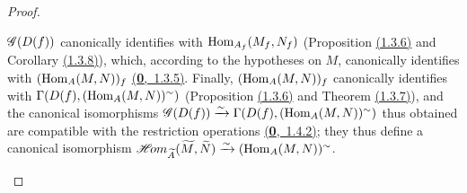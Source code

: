 \begin{proof}
\begin{itemize}
        $\mathscr{G}(D(f))$ canonically identifies with ${\mathop{\mathrm{Hom}}\nolimits}_{A_f}(M_f,N_f)$ (Proposition \hyperref[prop-1.1.3.6]{(1.3.6)}
        and Corollary \hyperref[cor-1.1.3.8]{(1.3.8)}), which, according to the hypotheses on $M$, canonically
        identifies with $({\mathop{\mathrm{Hom}}\nolimits}_A(M,N))_f$ \hyperref[env-0.1.3.5]{(\textbf{0},~1.3.5)}. Finally, $({\mathop{\mathrm{Hom}}\nolimits}_A(M,N))_f$
        canonically identifies with $\Gamma(D(f),({\mathop{\mathrm{Hom}}\nolimits}_A(M,N))^\sim)$ (Proposition \hyperref[prop-1.1.3.6]{(1.3.6)} and
        Theorem \hyperref[thm-1.1.3.7]{(1.3.7)}), and the canonical isomorphisms
        $\mathscr{G}(D(f))\xrightarrow{\sim}\Gamma(D(f),({\mathop{\mathrm{Hom}}\nolimits}_A(M,N))^\sim)$ thus obtained are compatible with
        the restriction operations \hyperref[env-0.1.4.2]{(\textbf{0},~1.4.2)}; they thus define a canonical
        isomorphism
        $\mathscr{H}\!{om}_{\widetilde{A}}(\widetilde{M},\widetilde{N})\xrightarrow{\sim}({\mathop{\mathrm{Hom}}\nolimits}_A(M,N))^\sim$.
\end{itemize}
\end{proof}

